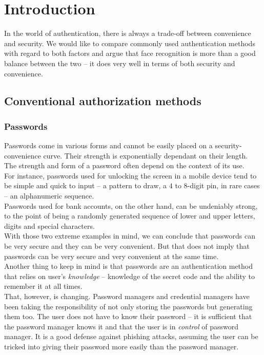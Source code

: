 \section{Introduction}
    In the world of authentication, there is always a trade-off between
    convenience and security. We would like to compare commonly used authentication
    methods with regard to both factors and argue that face recognition is more than
    a good balance between the two -- it does very well in terms of both security
    and convenience.

    \subsection{Conventional authorization methods}
        \subsubsection*{Passwords}
            Passwords come in various forms and cannot be easily placed on a
            security-convenience curve. Their strength is exponentially dependant
            on their length.\\
            The strength and form of a password often depend on the context of its
            use.\\
            For instance, passwords used for unlocking the screen in a mobile
            device tend to be simple and quick to input -- a pattern to draw, a
            $4$ to $8$-digit pin, in rare cases -- an alphanumeric sequence.\\
            Passwords used for bank accounts, on the other hand, can be undeniably
            strong, to the point of being a randomly generated sequence of lower
            and upper letters, digits and special characters.\\
            With those two extreme examples in mind, we can conclude that passwords
            can be very secure and they can be very convenient. But that does not
            imply that passwords can be very secure and very convenient at the
            same time.\\
            Another thing to keep in mind is that passwords are an authentication
            method that relies on user's \textit{knowledge} -- knowledge of the
            secret code and the ability to remember it at all times.\\
            That, however, is changing. Password managers and credential managers have been taking
            the responsibility of not only storing the passwords but generating
            them too. The user does not have to know their password -- it is sufficient
            that the password manager knows it and that the user is in \textit{control}
            of password manager. It is a good defense against phishing attacks,
            assuming the user can be tricked into giving their password more
            easily than the password manager. \\



